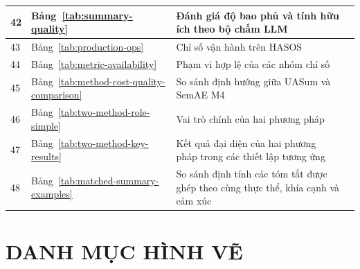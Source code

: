 \documentclass[12pt,a4paper]{report}
\begin{document}
\begin{longtable}{|p{}|p{}|p{}|p{}|}
42 & Bảng~\ref{tab:summary-quality} & Đánh giá độ bao phủ và tính hữu ích theo bộ chấm LLM & \pageref{tab:summary-quality} \\ \hline
43 & Bảng~\ref{tab:production-ops} & Chỉ số vận hành trên HASOS & \pageref{tab:production-ops} \\ \hline
44 & Bảng~\ref{tab:metric-availability} & Phạm vi hợp lệ của các nhóm chỉ số & \pageref{tab:metric-availability} \\ \hline
45 & Bảng~\ref{tab:method-cost-quality-comparison} & So sánh định hướng giữa UASum và SemAE M4 & \pageref{tab:method-cost-quality-comparison} \\ \hline
46 & Bảng~\ref{tab:two-method-role-simple} & Vai trò chính của hai phương pháp & \pageref{tab:two-method-role-simple} \\ \hline
47 & Bảng~\ref{tab:two-method-key-results} & Kết quả đại diện của hai phương pháp trong các thiết lập tương ứng & \pageref{tab:two-method-key-results} \\ \hline
48 & Bảng~\ref{tab:matched-summary-examples} & So sánh định tính các tóm tắt được ghép theo cùng thực thể, khía cạnh và cảm xúc & \pageref{tab:matched-summary-examples} \\ \hline
\end{longtable}
\renewcommand{\arraystretch}{1.0}

\chapter*{DANH MỤC HÌNH VẼ}
{}
\end{document}

